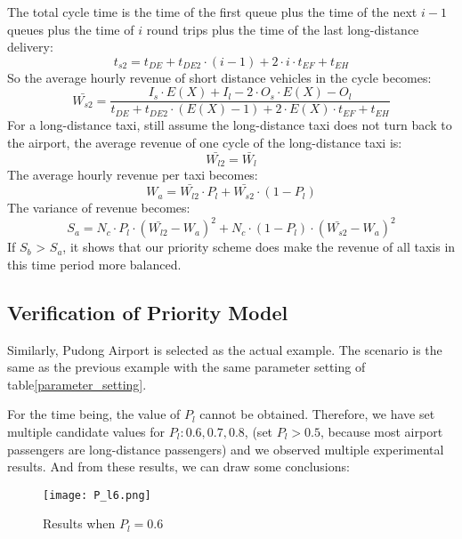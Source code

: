 The total cycle time is the time of the first queue plus the time of the next $i-1$ queues plus the time of $i$ round trips plus the time of the last long-distance delivery:
\begin{equation}
	t_{s2} = t_{DE}+t_{DE2}\cdot (i-1) + 2 \cdot i \cdot t_{EF} + t_{EH}
\label{t_s2}
\end{equation}
So the average hourly revenue of short distance vehicles in the cycle becomes:
\begin{equation}
	\bar{W_{s2}} = \frac{I_{s}\cdot E(X)+I_{l}-2\cdot O_{s}\cdot E(X)-O_{l}}{t_{DE} +t_{DE2}\cdot (E(X)-1)+2 \cdot E(X)\cdot t_{EF}+t_{EH}}
\label{W_s_2}
\end{equation}
For a long-distance taxi, still assume the long-distance taxi does not turn back to the airport, the average revenue of one cycle of the long-distance taxi is:
\begin{equation}
	\bar{W_{l2}} = \bar{W_{l}}
\label{W_l2_bar}
\end{equation}
The average hourly revenue per taxi becomes:
\begin{equation}
	W_{a} = \bar{W_{l2}}\cdot P_{l} + \bar{W_{s2}} \cdot (1 - P_{l})
\label{W_a}
\end{equation}
The variance of revenue becomes:
\begin{equation}
	S_{a} = N_{c}\cdot P_{l}\cdot (\bar{W_{l2}} - W_{a})^{2} + N_{c}\cdot(1- P_{l}) \cdot (\bar{W_{s2}} - W_{a})^{2}
\label{S_b}
\end{equation}
If $S_{b}$ > $S_{a}$, it shows that our priority scheme does make the revenue of all taxis in this time period more balanced.
\subsection{Verification of Priority Model}
Similarly, Pudong Airport is selected as the actual example. The scenario is the same as the previous example with the same parameter setting of table\ref{parameter_setting}. 

For the time being, the value of $P_{l}$ cannot be obtained. Therefore, we have set multiple candidate values for $P_{l}: 0.6, 0.7, 0.8$, (set $P_{l} > 0.5$, because most airport passengers are long-distance passengers) and we observed multiple experimental results. And from these results, we can draw some conclusions:
\begin{figure}[h]
\centering
\texttt{[image: P\_l6.png]}
\caption{Results when $P_{l} = 0.6$}
\label{P_l6}
\end{figure}


